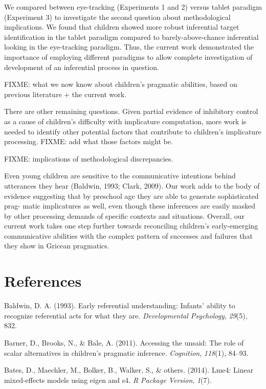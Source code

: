 \documentclass[a4paper,man,apacite,floatsintext]{apa6}
\begin{document}
We compared between eye-tracking (Experiments 1 and 2) versus tablet
paradigm (Experiment 3) to investigate the second question about
methodological implications. We found that children showed more robust
inferential target identification in the tablet paradigm compared to
barely-above-chance inferential looking in the eye-tracking paradigm.
Thus, the current work demonstrated the importance of employing
different paradigms to allow complete investigation of development of an
inferential process in question.

FIXME: what we now know about children's pragmatic abilities, based on
previous literature + the current work.

There are other remaining questions. Given partial evidence of
inhibitory control as a cause of children's difficulty with implicature
computation, more work is needed to identify other potential factors
that contribute to children's implicature processing. FIXME: add what
those factors might be.

FIXME: implications of methodological discrepancies.

Even young children are sensitive to the communicative intentions behind
utterances they hear (Baldwin, 1993; Clark, 2009). Our work adds to the
body of evidence suggesting that by preschool age they are able to
generate sophisticated prag- matic implicatures as well, even though
these inferences are easily masked by other processing demands of
specific contexts and situations. Overall, our current work takes one
step further towards reconciling children's early-emerging communicative
abilities with the complex pattern of successes and failures that they
show in Gricean pragmatics.

\newpage

\section*{References}\label{references}

Baldwin, D. A. (1993). Early referential understanding: Infants' ability
to recognize referential acts for what they are. \emph{Developmental
Psychology}, \emph{29}(5), 832.

Barner, D., Brooks, N., \& Bale, A. (2011). Accessing the unsaid: The
role of scalar alternatives in children's pragmatic inference.
\emph{Cognition}, \emph{118}(1), 84--93.

Bates, D., Maechler, M., Bolker, B., Walker, S., \& others. (2014).
Lme4: Linear mixed-effects models using eigen and s4. \emph{R Package
Version}, \emph{1}(7).
\end{document}
